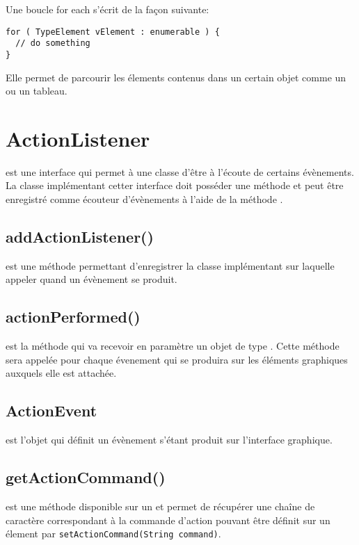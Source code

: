 Une boucle for each s'écrit de la façon suivante:

\begin{verbatim}
for ( TypeElement vElement : enumerable ) {
  // do something
}
\end{verbatim}

Elle permet de parcourir les élements contenus dans un certain objet comme un  ou un tableau.

\section{ActionListener}

 est une interface qui permet à une classe d'être à l'écoute de certains évènements. La classe implémentant cetter interface doit posséder une méthode  et peut être enregistré comme écouteur d'évènements à l'aide de la méthode .

\subsection{addActionListener()}

 est une méthode permettant d'enregistrer la classe implémentant  sur laquelle appeler  quand un évènement se produit.

\subsection{actionPerformed()}

 est la méthode qui va recevoir en paramètre un objet de type . Cette méthode sera appelée pour chaque évenement qui se produira sur les éléments graphiques auxquels elle est attachée.

\subsection{ActionEvent}

 est l'objet qui définit un évènement s'étant produit sur l'interface graphique.

\subsection{getActionCommand()}

 est une méthode disponible sur un  et permet de récupérer une chaîne de caractère correspondant à la commande d'action pouvant être définit sur un élement par \texttt{setActionCommand(String command)}.

